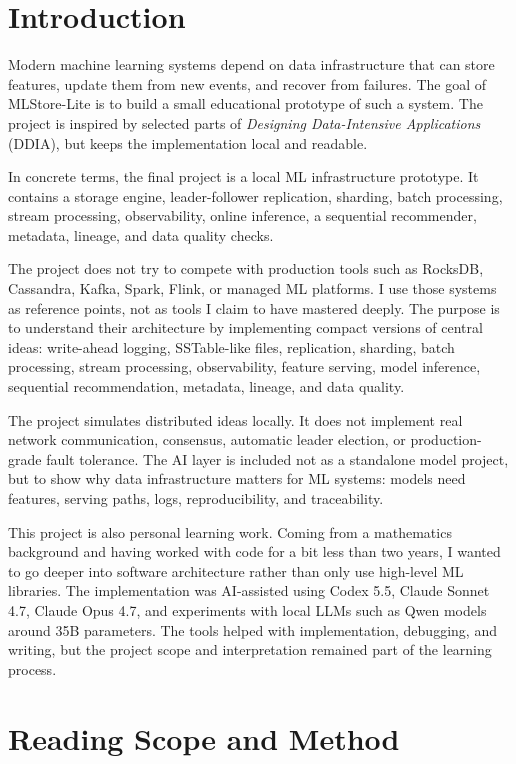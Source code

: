 \section{Introduction}\label{sec:introduction}

Modern machine learning systems depend on data infrastructure that can store
features, update them from new events, and recover from failures. The goal of
MLStore-Lite is to build a small educational prototype of such a system. The
project is inspired by selected parts of \textit{Designing Data-Intensive
Applications} (DDIA), but keeps the implementation local and readable.

In concrete terms, the final project is a local ML infrastructure prototype. It
contains a storage engine, leader-follower replication, sharding, batch
processing, stream processing, observability, online inference, a sequential
recommender, metadata, lineage, and data quality checks.

The project does not try to compete with production tools such as RocksDB,
Cassandra, Kafka, Spark, Flink, or managed ML platforms. I use those systems as
reference points, not as tools I claim to have mastered deeply. The purpose is
to understand their architecture by implementing compact versions of central
ideas: write-ahead logging, SSTable-like files, replication, sharding, batch
processing, stream processing, observability, feature serving, model inference,
sequential recommendation, metadata, lineage, and data quality.

The project simulates distributed ideas locally. It does not implement real
network communication, consensus, automatic leader election, or production-grade
fault tolerance. The AI layer is included not as a standalone model project, but
to show why data infrastructure matters for ML systems: models need features,
serving paths, logs, reproducibility, and traceability.

This project is also personal learning work. Coming from a mathematics
background and having worked with code for a bit less than two years, I wanted
to go deeper into software architecture rather than only use high-level ML
libraries. The implementation was AI-assisted using Codex 5.5, Claude Sonnet
4.7, Claude Opus 4.7, and experiments with local LLMs such as Qwen models around
35B parameters. The tools helped with implementation, debugging, and writing,
but the project scope and interpretation remained part of the learning process.

\section{Reading Scope and Method}\label{sec:method}

